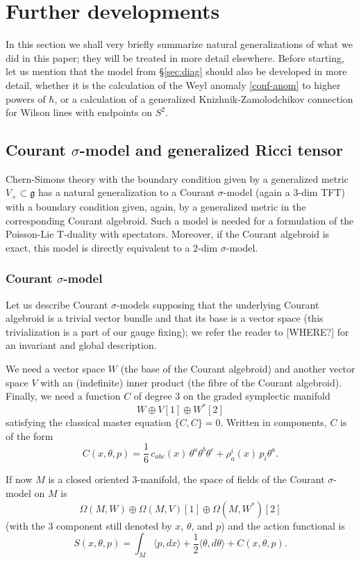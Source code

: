 \documentclass[a4paper]{amsart}
\theoremstyle{plain}
\theoremstyle{definition}
\newcommand{\g}{\mathfrak{g}}
\newcommand{\la}{\langle}
\newcommand{\ra}{\rangle}
\begin{document}
\section{Further developments}
In this section we shall very briefly summarize natural generalizations of what we did in this paper; they will be treated in more detail elsewhere. Before starting, let us mention that the model from \S\ref{sec:diag} should also be developed in more detail, whether it is the calculation of the Weyl anomaly \eqref{conf-anom} to higher powers of $\hbar$, or a calculation of a generalized Knizhnik-Zamolodchikov connection for  Wilson lines with endpoints on $S^2$.

\subsection{Courant $\sigma$-model and generalized Ricci tensor}
Chern-Simons theory with the boundary condition given by a generalized metric $V_+\subset\g$ has a natural generalization to a Courant $\sigma$-model (again a 3-dim TFT) with a boundary condition given, again, by a generalized metric in the corresponding Courant algebroid. Such a model is needed for a formulation of the Poisson-Lie T-duality with spectators. Moreover, if the Courant algebroid is exact, this model is directly equivalent to a 2-dim $\sigma$-model.

\subsubsection{Courant $\sigma$-model}
Let us describe Courant $\sigma$-models supposing that the underlying Courant algebroid is a trivial vector bundle and that its base is a vector space (this trivialization is a part of our gauge fixing); we refer the reader to [WHERE?] for an invariant and global description. 

We need a vector space $W$ (the base of the Courant algebroid) and another vector space $V$ with an (indefinite) inner product (the fibre of the Courant algebroid). Finally, we need a function $C$ of degree 3 on the graded symplectic manifold 
$$W\oplus V[1]\oplus W^*[2]$$
satisfying the classical master equation $\{C,C\}=0$. Written in components, $C$ is of the form
$$C(x,\theta,p)=\frac16\,c_{abc}(x)\,\theta^a\theta^b\theta^c + \rho^i_a(x)\,p_i\theta^a.$$

If now $M$ is a closed oriented 3-manifold, the space of fields of the Courant $\sigma$-model on $M$ is
$$\Omega(M,W)\oplus\Omega(M,V)[1]\oplus\Omega(M,W^*)[2]$$
(with the 3 component still denoted by $x$, $\theta$, and $p$)
and the action functional is
$$S(x,\theta,p)=\int_M\la p,dx\ra + \frac12 \la\theta,d\theta\ra + C(x,\theta,p).$$
\end{document}
